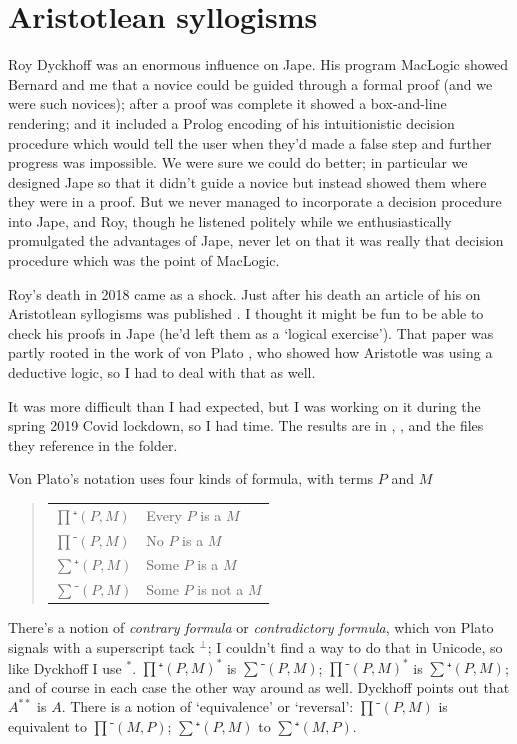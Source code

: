 \chapter{Aristotlean syllogisms}
\label{chap:Aristotle}

Roy Dyckhoff was an enormous influence on Jape. His program MacLogic \citep{dyckhoff1989malt} showed Bernard and me that a novice could be guided through a formal proof (and we were such novices); after a proof was complete it showed a box-and-line rendering; and it included a Prolog encoding of his intuitionistic decision procedure \citep{dyckhoff1992contraction} which would tell the user when they'd made a false step and further progress was impossible. We were sure we could do better; in particular we designed Jape so that it didn't guide a novice but instead showed them where they were in a proof. But we never managed to incorporate a decision procedure into Jape, and Roy, though he listened politely while we enthusiastically promulgated the advantages of Jape, never let on that it was really that decision procedure which was the point of MacLogic. 

Roy's death in 2018 came as a shock. Just after his death an article of his on Aristotlean syllogisms was published \citep{dyckhoff2019indefinite}. I thought it might be fun to be able to check his proofs in Jape (he'd left them as a `logical exercise'). That paper was partly rooted in the work of von Plato \citep{von2016aristotle}, who showed how Aristotle was using a deductive logic, so I had to deal with that as well.

It was more difficult than I had expected, but I was working on it during the spring 2019 Covid lockdown, so I had time. The results are in , , and the files they reference in the  folder.

Von Plato's notation uses four kinds of formula, with terms $P$ and $M$
\begin{quote}
\begin{tabular}{ll}
$∏⁺(P,M)$ & Every $P$ is a $M$ \\
$∏⁻(P,M)$ & No $P$ is a $M$ \\
$∑⁺(P,M)$ & Some $P$ is a $M$ \\
$∑⁻(P,M)$ & Some $P$ is not a $M$ \\
\end{tabular}
\end{quote}
There's a notion of \emph{contrary formula} or \emph{contradictory formula}, which von Plato signals with a superscript tack $^{⊥}$; I couldn't find a way to do that in Unicode, so like Dyckhoff I use $^{*}$. $∏⁺(P,M)^{*}$ is $∑⁻(P,M)$; $∏⁻(P,M)^{*}$ is $∑⁺(P,M)$; and of course in each case the other way around as well. Dyckhoff points out that $A^{{*}{*}}$ is $A$. There is a notion of `equivalence' or `reversal': $∏⁻(P,M)$ is equivalent to $∏⁻(M,P)$; $∑⁺(P,M)$ to $∑⁺(M,P)$.


